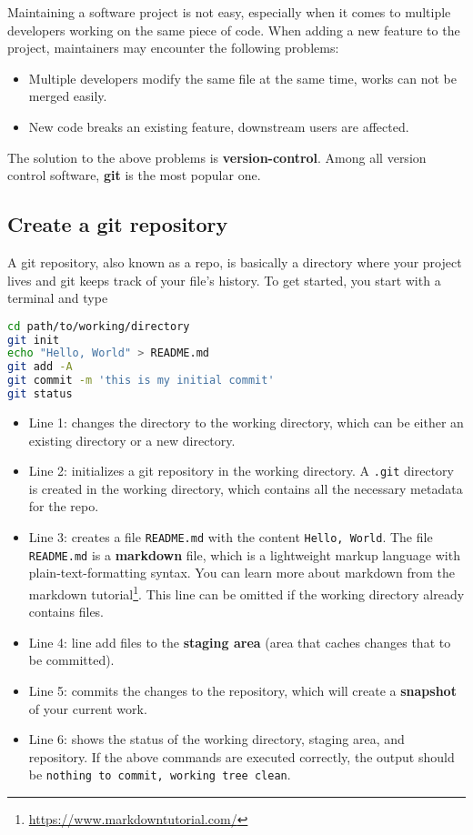 \documentclass[
  notoc %
]{tufte-book}
\DeclareRobustCommand{\href}[2]{#2\footnote{\url{#1}}}
\providecommand{\tightlist}{%
  \setlength{\itemsep}{0pt}\setlength{\parskip}{0pt}
}
\newcommand{\passthrough}[1]{#1}
\begin{document}
Maintaining a software project is not easy, especially when it comes to
multiple developers working on the same piece of code. When adding a new
feature to the project, maintainers may encounter the following
problems:

\begin{itemize}
\tightlist
\item
  Multiple developers modify the same file at the same time, works can
  not be merged easily.
\item
  New code breaks an existing feature, downstream users are affected.
\end{itemize}

The solution to the above problems is \textbf{version-control}. Among
all version control software, \textbf{git} is the most popular one.

\hypertarget{create-a-git-repository}{%
\subsection{Create a git repository}\label{create-a-git-repository}}

A git repository, also known as a repo, is basically a directory where
your project lives and git keeps track of your file's history. To get
started, you start with a terminal and type

\begin{lstlisting}[language=bash]
cd path/to/working/directory
git init
echo "Hello, World" > README.md
git add -A
git commit -m 'this is my initial commit'
git status
\end{lstlisting}

\begin{itemize}
\tightlist
\item
  Line 1: changes the directory to the working directory, which can be
  either an existing directory or a new directory.
\item
  Line 2: initializes a git repository in the working directory. A
  \passthrough{\lstinline!.git!} directory is created in the working
  directory, which contains all the necessary metadata for the repo.
\item
  Line 3: creates a file \passthrough{\lstinline!README.md!} with the
  content \passthrough{\lstinline!Hello, World!}. The file
  \passthrough{\lstinline!README.md!} is a \textbf{markdown} file, which
  is a lightweight markup language with plain-text-formatting syntax.
  You can learn more about markdown from the
  \href{https://www.markdowntutorial.com/}{markdown tutorial}. This line
  can be omitted if the working directory already contains files.
\item
  Line 4: line add files to the \textbf{staging area} (area that caches
  changes that to be committed).
\item
  Line 5: commits the changes to the repository, which will create a
  \textbf{snapshot} of your current work.
\item
  Line 6: shows the status of the working directory, staging area, and
  repository. If the above commands are executed correctly, the output
  should be
  \passthrough{\lstinline!nothing to commit, working tree clean!}.
\end{itemize}
\end{document}
